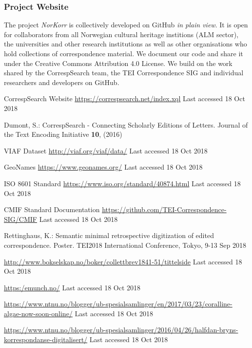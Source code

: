 \documentclass[runningheads]{llncs}
\begin{document}
\subsubsection{Project Website}\label{project-website}

The project \textit{NorKorr} is collectively developed on GitHub \textit{in plain
view}. It is open for collaborators from all Norwegian cultural heritage
institions (ALM sector), the universities and other research
institutions as well as other organisations who hold collections of
correspondence material. We document our code and share it under the
Creative Commons Attribution 4.0 License. We build on the work shared by
the CorrespSearch team, the TEI Correspondence SIG and individual
researchers and developers on GitHub.

\begin{thebibliography}{8}

CorrespSearch Website \url{https://correspsearch.net/index.xql}
Last accessed 18 Oct 2018

Dumont, S.: CorrespSearch - Connecting Scholarly Editions of Letters. Journal of the Text Encoding Initiative \textbf{10}, (2016)

VIAF Dataset \url{http://viaf.org/viaf/data/}
Last accessed 18 Oct 2018

GeoNames \url{https://www.geonames.org/}
Last accessed 18 Oct 2018

ISO 8601 Standard \url{https://www.iso.org/standard/40874.html}
Last accessed 18 Oct 2018

CMIF Standard Documentation \url{https://github.com/TEI-Correspondence-SIG/CMIF}
Last accessed 18 Oct 2018

Rettinghaus, K.: Semantic minimal retrospective digitization of edited correspondence. Poster. TEI2018 International Conference, Tokyo, 9-13 Sep 2018

\url{http://www.bokselskap.no/boker/collettbrev1841-51/tittelside}
Last accessed 18 Oct 2018

\url{https:/emunch.no/}
Last accessed 18 Oct 2018

\url{https://www.ntnu.no/blogger/ub-spesialsamlinger/en/2017/03/23/coralline-algae-now-soon-online/}
Last accessed 18 Oct 2018

\url{https://www.ntnu.no/blogger/ub-spesialsamlinger/2016/04/26/halfdan-bryns-korrespondanse-digitalisert/}
Last accessed 18 Oct 2018


\end{thebibliography}
\end{document}
